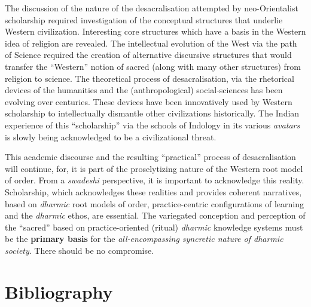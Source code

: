 The discussion of the nature of the desacralisation attempted by neo-Orientalist scholarship required investigation of the conceptual structures that underlie Western civilization. Interesting core structures which have a basis in the Western idea of religion are revealed. The intellectual evolution of the West via the path of Science required the creation of alternative discursive structures that would transfer the “Western” notion of sacred (along with many other structures) from religion to science. The theoretical process of desacralisation, via the rhetorical devices of the humanities and the (anthropological) social-sciences has been evolving over centuries. These devices have been innovatively used by Western scholarship to intellectually dismantle other civilizations historically. The Indian experience of this “scholarship” via the schools of Indology in its various \textit{avatars} is slowly being acknowledged to be a civilizational threat. 

This academic discourse and the resulting “practical” process of desacralisation will continue, for, it is part of the proselytizing nature of the Western root model of order. From a \textit{swadeshi} perspective, it is important to acknowledge this reality. Scholarship, which acknowledges these realities and provides coherent narratives, based on \textit{dharmic} root models of order, practice-centric configurations of learning and the \textit{dharmic} ethos, are essential. The variegated conception and perception of the “sacred” based on practice-oriented (ritual) \textit{dharmic} knowledge systems must be the \textbf{primary basis} for the\textit{ all-encompassing syncretic nature of dharmic society}. There should be no compromise.


\section*{Bibliography}

